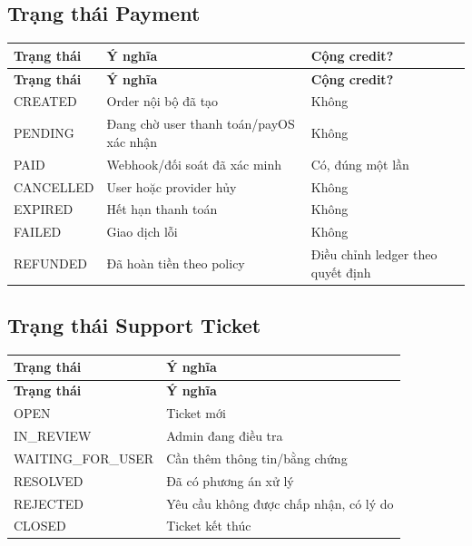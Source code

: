 \documentclass[11pt,a4paper]{article}
\begin{document}
\subsection{Trạng thái Payment}
\small
\setlength{\tabcolsep}{4pt}
\renewcommand{\arraystretch}{1.18}
\begin{longtable}{|P{0.22\textwidth}|P{0.50\textwidth}|P{0.20\textwidth}|}
\hline
\textbf{Trạng thái} & \textbf{Ý nghĩa} & \textbf{Cộng credit?} \\ \hline
\endfirsthead
\hline
\textbf{Trạng thái} & \textbf{Ý nghĩa} & \textbf{Cộng credit?} \\ \hline
\endhead
CREATED & Order nội bộ đã tạo & Không \\ \hline
PENDING & Đang chờ user thanh toán/\allowbreak{}payOS xác nhận & Không \\ \hline
PAID & Webhook/\allowbreak{}đối soát đã xác minh & Có, đúng một lần \\ \hline
CANCELLED & User hoặc provider hủy & Không \\ \hline
EXPIRED & Hết hạn thanh toán & Không \\ \hline
FAILED & Giao dịch lỗi & Không \\ \hline
REFUNDED & Đã hoàn tiền theo policy & Điều chỉnh ledger theo quyết định \\ \hline
\end{longtable}
\normalsize
\subsection{Trạng thái Support Ticket}
\small
\setlength{\tabcolsep}{4pt}
\renewcommand{\arraystretch}{1.18}
\begin{longtable}{|P{0.25\textwidth}|P{0.67\textwidth}|}
\hline
\textbf{Trạng thái} & \textbf{Ý nghĩa} \\ \hline
\endfirsthead
\hline
\textbf{Trạng thái} & \textbf{Ý nghĩa} \\ \hline
\endhead
OPEN & Ticket mới \\ \hline
IN\_\allowbreak{}REVIEW & Admin đang điều tra \\ \hline
WAITING\_\allowbreak{}FOR\_\allowbreak{}USER & Cần thêm thông tin/\allowbreak{}bằng chứng \\ \hline
RESOLVED & Đã có phương án xử lý \\ \hline
REJECTED & Yêu cầu không được chấp nhận, có lý do \\ \hline
CLOSED & Ticket kết thúc \\ \hline
\end{longtable}
\normalsize
\end{document}
